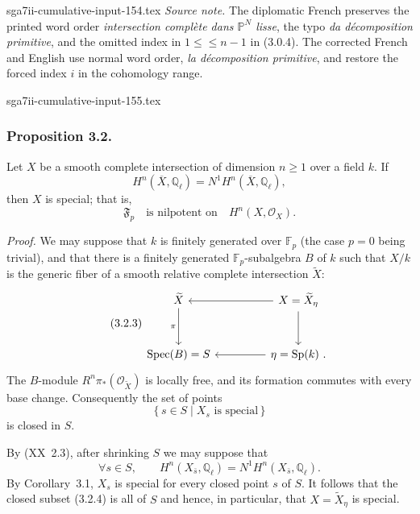 \begin{filecontents*}{sga7ii-cumulative-input-154.tex}
\medskip
\noindent\emph{Source note.}
The diplomatic French preserves the printed word order
\emph{intersection complète dans $\mathbb P^N$ lisse}, the typo
\emph{da décomposition primitive}, and the omitted index in
$1\leq{}\leq n-1$ in (3.0.4).  The corrected French and English use normal
word order, \emph{la décomposition primitive}, and restore the forced index
$i$ in the cohomology range.
\end{filecontents*}
\begin{filecontents*}{sga7ii-cumulative-input-155.tex}
\subsubsection*{Proposition 3.2.}
Let $X$ be a smooth complete intersection of dimension $n\geq1$ over a
field $k$.  If
\begin{equation}\tag{3.2.1}
H^n(\overline X,\mathbb Q_\ell)=N^1H^n(\overline X,\mathbb Q_\ell),
\end{equation}
then $X$ is special; that is,
\begin{equation}\tag{3.2.2}
\mathfrak F_p\quad\text{is nilpotent on}\quad H^n(X,\mathcal O_X).
\end{equation}

\medskip
\noindent\emph{Proof.}
We may suppose that $k$ is finitely generated over $\mathbb F_p$ (the case
$p=0$ being trivial), and that there is a finitely generated
$\mathbb F_p$-subalgebra $B$ of $k$ such that $X/k$ is the generic fiber of a
smooth relative complete intersection $\widetilde X$:
\begin{equation}\tag{3.2.3}
\begin{tikzcd}[column sep=4.5em,row sep=3em]
\widetilde X \arrow[d,"\pi"'] &
X=\widetilde X_\eta \arrow[l] \arrow[d] \\
\operatorname{Spec}(B)=S & \eta=\operatorname{Sp}(k)\ . \arrow[l]
\end{tikzcd}
\end{equation}
The $B$-module $R^n\pi_*(\mathcal O_{\widetilde X})$ is locally free, and its
formation commutes with every base change.  Consequently the set of points
\begin{equation}\tag{3.2.4}
\{\,s\in S\mid X_s\text{ is special}\,\}
\end{equation}
is closed in $S$.

By (XX~2.3), after shrinking $S$ we may suppose that
\begin{equation}\tag{3.2.5}
\forall s\in S,\qquad
H^n(X_{\bar s},\mathbb Q_\ell)=N^1H^n(X_{\bar s},\mathbb Q_\ell).
\end{equation}
By Corollary~3.1, $X_s$ is special for every closed point $s$ of $S$.
It follows that the closed subset (3.2.4) is all of $S$ and hence, in
particular, that $X=\widetilde X_\eta$ is special.


\end{filecontents*}
